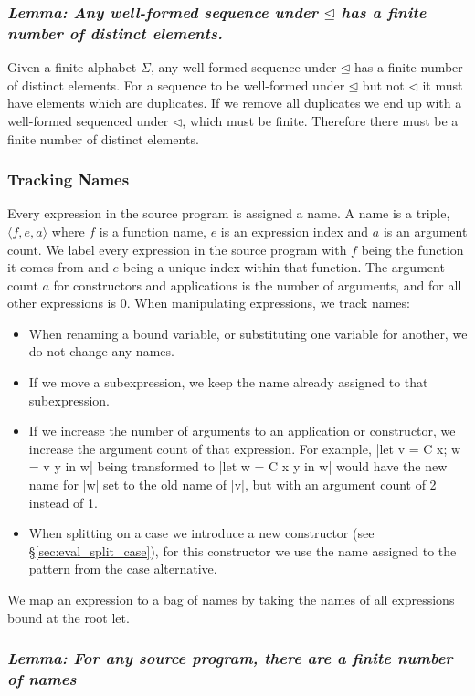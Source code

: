 \documentclass[draft]{sigplanconf}
\newcommand{\name}[3]{\ensuremath{\langle\mathsf{#1},\mathsf{#2},\mathsf{#3}\rangle}}
\newcommand{\lemma}[1]{\subsubsection*{\textit{Lemma: #1}}}
\begin{document}
\lemma{Any well-formed sequence under $\unlhd$ has a finite number of distinct elements.}

Given a finite alphabet $\Sigma$, any well-formed sequence under $\unlhd$ has a finite number of distinct elements. For a sequence to be well-formed under $\unlhd$ but not $\lhd$ it must have elements which are duplicates. If we remove all duplicates we end up with a well-formed sequenced under $\lhd$, which must be finite. Therefore there must be a finite number of distinct elements.

\subsubsection{Tracking Names}

Every expression in the source program is assigned a name. A name is a triple, \name{\mathit{f}}{\mathit{e}}{\mathit{a}} where $f$ is a function name, $e$ is an expression index and $a$ is an argument count. We label every expression in the source program with $f$ being the function it comes from and $e$ being a unique index within that function. The argument count $a$ for constructors and applications is the number of arguments, and for all other expressions is 0. When manipulating expressions, we track names:

\begin{itemize}
\item When renaming a bound variable, or substituting one variable for another, we do not change any names.
\item If we move a subexpression, we keep the name already assigned to that subexpression.
\item If we increase the number of arguments to an application or constructor, we increase the argument count of that expression. For example, |let v = C x; w = v y in w| being transformed to |let w = C x y in w| would have the new name for |w| set to the old name of |v|, but with an argument count of 2 instead of 1.
\item When splitting on a case we introduce a new constructor (see \S\ref{sec:eval_split_case}), for this constructor we use the name assigned to the pattern from the case alternative.
\end{itemize}

We map an expression to a bag of names by taking the names of all expressions bound at the root let.

\lemma{For any source program, there are a finite number of names}
\end{document}
